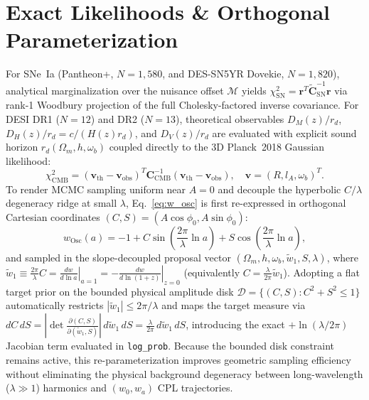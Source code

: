 \documentclass[10pt,twocolumn,a4paper]{article}
\begin{document}
\section{Exact Likelihoods \& Orthogonal Parameterization}
For SNe~Ia (Pantheon+, $N=1,580$, and DES-SN5YR Dovekie, $N=1,820$), analytical marginalization over the nuisance offset $\mathcal{M}$ yields $\chi^2_{\mathrm{SN}} = \mathbf{r}^T \tilde{\mathbf{C}}_{\mathrm{SN}}^{-1} \mathbf{r}$ via rank-1 Woodbury projection of the full Cholesky-factored inverse covariance. For DESI DR1 ($N=12$) and DR2 ($N=13$), theoretical observables $D_M(z)/r_d$, $D_H(z)/r_d = c/(H(z) r_d)$, and $D_V(z)/r_d$ are evaluated with explicit sound horizon $r_d(\Omega_m, h, \omega_b)$ coupled directly to the 3D Planck~2018 Gaussian likelihood:
\begin{equation}
\chi^2_{\mathrm{CMB}} = (\mathbf{v}_{\mathrm{th}} - \mathbf{v}_{\mathrm{obs}})^T \mathbf{C}_{\mathrm{CMB}}^{-1} (\mathbf{v}_{\mathrm{th}} - \mathbf{v}_{\mathrm{obs}}), \quad \mathbf{v} = (R, l_A, \omega_b)^T.
\end{equation}
To render MCMC sampling uniform near $A=0$ and decouple the hyperbolic $C/\lambda$ degeneracy ridge at small $\lambda$, Eq.~\eqref{eq:w_osc} is first re-expressed in orthogonal Cartesian coordinates $(C, S) = (A\cos\phi_0, A\sin\phi_0)$:
\begin{equation}
w_{\mathrm{Osc}}(a) = -1 + C\sin\!\left(\frac{2\pi}{\lambda}\ln a\right) + S\cos\!\left(\frac{2\pi}{\lambda}\ln a\right),
\end{equation}
and sampled in the slope-decoupled proposal vector $(\Omega_m, h, \omega_b, \tilde{w}_1, S, \lambda)$, where $\tilde{w}_1 \equiv \frac{2\pi}{\lambda}C = \left.\frac{dw}{d\ln a}\right|_{a=1} = -\left.\frac{dw}{d\ln(1+z)}\right|_{z=0}$ (equivalently $C = \frac{\lambda}{2\pi}\tilde{w}_1$). Adopting a flat target prior on the bounded physical amplitude disk $\mathcal{D} = \{(C, S) : C^2 + S^2 \le 1\}$ automatically restricts $|\tilde{w}_1| \le 2\pi/\lambda$ and maps the target measure via $dC\,dS = \left|\det\frac{\partial(C,S)}{\partial(\tilde{w}_1,S)}\right|\,d\tilde{w}_1\,dS = \frac{\lambda}{2\pi}\,d\tilde{w}_1\,dS$, introducing the exact $+\ln(\lambda/2\pi)$ Jacobian term evaluated in \texttt{log\_prob}. Because the bounded disk constraint remains active, this re-parameterization improves geometric sampling efficiency without eliminating the physical background degeneracy between long-wavelength ($\lambda \gg 1$) harmonics and $(w_0, w_a)$ CPL trajectories.
\end{document}
